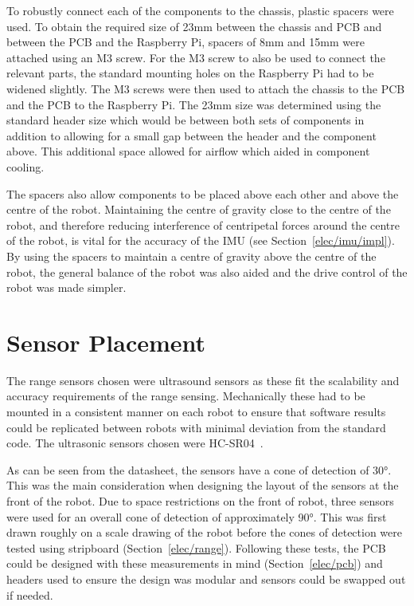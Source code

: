 To robustly connect each of the components to the 
chassis, plastic spacers were used. To obtain the required size 
of 23mm between the chassis and PCB 
and between the PCB and the Raspberry Pi, spacers of 8mm and 15mm 
were attached using an M3 screw. For the M3 screw to also 
be used to connect the relevant parts, the standard mounting holes 
on the Raspberry Pi had to be widened slightly. The M3 screws were 
then used to attach the chassis to the PCB and the PCB to the 
Raspberry Pi. The 23mm size was determined using the standard 
header size which would be between both sets of components in 
addition to allowing for a small gap between the header and the 
component above. This additional space allowed for airflow which 
aided in component cooling. 

The spacers also allow components to be placed above each other 
and above the centre of the robot. Maintaining the centre of 
gravity close to the centre of the robot, and therefore reducing 
interference of centripetal forces around the centre of the robot, 
is vital for the accuracy of the IMU (see Section~\ref{elec/imu/impl}). By using 
the spacers to maintain a centre of gravity above the centre of the 
robot, the general balance of the robot was also aided and the drive 
control of the robot was made simpler.    

\section{Sensor Placement}\label{mech/sensors}
The range sensors chosen were ultrasound sensors as these fit the
scalability and accuracy requirements of the range sensing. 
Mechanically these had to be mounted in a consistent manner on each 
robot to ensure that software results could be replicated between 
robots with minimal deviation from the standard code. The ultrasonic 
sensors chosen were HC-SR04~\cite{HCSR04datasheet}.

As can be seen from the datasheet, the sensors have a cone of 
detection of \ang{30}. This was the main consideration when designing 
the layout of the sensors at the front of the robot. Due to space 
restrictions on the front of robot, three sensors were used for an 
overall cone of detection of approximately \ang{90}. This was first 
drawn roughly on a scale drawing of the robot before the cones of 
detection were tested using stripboard (Section~\ref{elec/range}). 
Following these tests, the PCB could be designed with these measurements 
in mind (Section~\ref{elec/pcb}) and headers used to ensure the design 
was modular and sensors could be swapped out if needed. 

